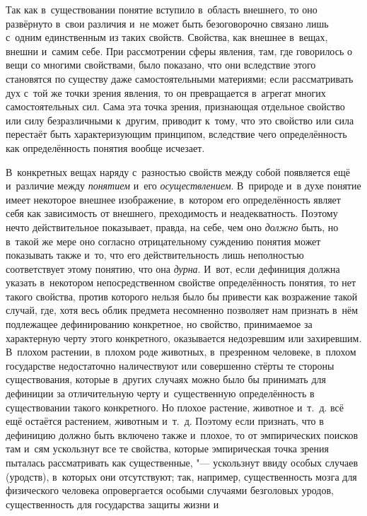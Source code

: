 Так как в~существовании понятие вступило в~область внешнего,
то оно развёрнуто в~свои различия и~не может быть безоговорочно связано
лишь с~одним единственным из таких свойств. Свойства, как внешнее в~вещах,
внешни и~самим себе. При рассмотрении сферы явления, там, где говорилось о
вещи со многими свойствами, было показано, что они вследствие этого
становятся по существу даже самостоятельными материями; если рассматривать
дух с~той же точки зрения явления, то он превращается в~агрегат многих
самостоятельных сил. Сама эта точка зрения, признающая отдельное свойство
или силу безразличными к~другим, приводит к~тому, что это свойство или сила
перестаёт быть характеризующим принципом, вследствие чего определённость
как определённость понятия вообще исчезает.

В~конкретных вещах наряду с~разностью свойств между собой
появляется ещё и~различие между {\em понятием} и~его {\em осуществлением}.
В~природе и~в духе понятие имеет некоторое внешнее изображение, в~котором его
определённость являет себя как зависимость от внешнего, преходимость и
неадекватность. Поэтому нечто действительное показывает, правда, на себе,
чем оно {\em должно}
быть, но в~такой же мере оно согласно отрицательному суждению
понятия может показывать также и~то, что его действительность лишь
неполностью соответствует этому понятию, что она {\em дурна}. И~вот, если
дефиниция должна указать в~некотором непосредственном свойстве
определённость понятия, то нет такого свойства, против которого нельзя было
бы привести как возражение такой случай, где, хотя весь облик предмета
несомненно позволяет нам признать в~нём подлежащее
дефинированию конкретное, но свойство, принимаемое за характерную черту
этого конкретного, оказывается недозревшим или захиревшим. В~плохом
растении, в~плохом роде животных, в~презренном человеке, в~плохом
государстве недостаточно наличествуют или совершенно стёрты те стороны
существования, которые в~других случаях можно было бы принимать для
дефиниции за отличительную черту и~существенную определённость в
существовании такого конкретного. Но плохое растение, животное и~т.~д. всё
ещё остаётся растением, животным и~т.~д. Поэтому если признать, что в
дефиницию должно быть включено также и~плохое, то от эмпирических поисков
там и~сям ускользнут все те свойства, которые эмпирическая точка зрения
пыталась рассматривать как существенные, "--- ускользнут ввиду
особых случаев (уродств), в~которых они отсутствуют; так, например,
существенность мозга для физического человека опровергается особыми
случаями безголовых уродов, существенность для государства защиты жизни и
